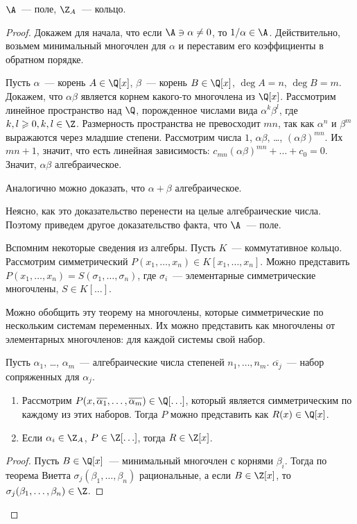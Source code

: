 \begin{theorem}
  $\A$~— поле, $\Z_A$~— кольцо.
\end{theorem}
\begin{proof}
  Докажем для начала, что если $\A \ni \alpha \ne 0$, то $1 / \alpha
  \in \A$. Действительно, возьмем минимальный многочлен для $\alpha$ и
  переставим его коэффициенты в обратном порядке.
  
  Пусть $\alpha$~— корень $A \in \Q[x]$, $\beta$~— корень $B \in
  \Q[x]$, $\deg A = n$, $\deg B = m$.  Докажем, что $\alpha \beta$
  является корнем какого-то многочлена из $\Q[x]$. Рассмотрим линейное
  пространство над $\Q$, порожденное числами вида $\alpha^k \beta^l$,
  где $k, l \geqslant 0, k, l \in \Z$. Размерность пространства не
  превосходит $mn$, так как $\alpha^n$ и $\beta^m$ выражаются через
  младшие степени. Рассмотрим числа $1$, $\alpha \beta$, \ldots,
  $(\alpha \beta)^{mn}$. Их $mn + 1$, значит, что есть линейная
  зависимость: $c_{mn}(\alpha \beta)^{mn} + \ldots + c_0 = 0$. Значит,
  $\alpha\beta$ алгебраическое.
  
  Аналогично можно доказать, что $\alpha + \beta$ алгебраическое.
  
  Неясно, как это доказательство перенести на целые алгебраические
  числа. Поэтому приведем другое доказательство факта, что $\A$~—
  поле.
  
  Вспомним некоторые сведения из алгебры. Пусть $K$~— коммутативное
  кольцо. Рассмотрим симметрический $P(x_1, \ldots, x_n) \in K[x_1,
    \ldots, x_n]$. Можно представить $P(x_1, \ldots, x_n) =
  S(\sigma_1, \ldots, \sigma_n)$, где $\sigma_i$~— элементарные
  симметрические многочлены, $S \in K[\ldots]$.
  
  Можно обобщить эту теорему на многочлены, которые симметрические по
  нескольким системам переменных. Их можно представить как многочлены
  от элементарных многочленов: для каждой системы свой набор.
  
  \begin{lemma}
    Пусть $\alpha_1$, \ldots, $\alpha_m$~— алгебраические числа
    степеней $n_1, \ldots, n_m$. $\overline{\alpha_j}$~— набор
    сопряженных для $\alpha_j$.
    
    \begin{enumerate}
    \item
    Рассмотрим $P(x,\overline{\alpha_1}, \ldots, \overline{\alpha_m})
    \in \Q[\ldots]$, который является симметрическим по каждому из
    этих наборов. Тогда $P$ можно представить как $R(x) \in \Q[x]$.
    \item Если $\alpha_i \in \Z_A$, $P \in \Z[\ldots]$, тогда $R \in
      \Z[x]$.
    \end{enumerate}
  \end{lemma}
  \begin{proof}
    Пусть $B \in \Q[x]$~— минимальный многочлен с корнями
    $\beta_i$. Тогда по теорема Виетта $\sigma_j(\beta_1, \ldots,
    \beta_n)$ рациональные, а если $B \in \Z[x]$, то
    $\sigma_j(\beta_1, \ldots, \beta_n) \in \Z$.
    

\end{proof}
\end{proof}
